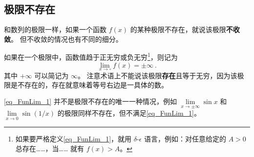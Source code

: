 \subsection{极限不存在}
和数列的极限一样，如果一个函数 $f(x)$ 的某种极限不存在，就说该极限\textbf{不收敛}。 但不收敛的情况也有不同的细分。

如果在一个极限中，函数值趋于正无穷或负无穷\footnote{如果要严格定义\autoref{eq_FunLim_1}，就用 $\delta$-$\epsilon$ 语言，例如：对任意给定的 $A > 0$ 总存在……，当…… 就有 $f(x) > A$。}，则记为
\begin{equation}\label{eq_FunLim_1}
\lim\limits_{x\to \square} f(x) = \pm\infty~.
\end{equation}
其中 $+\infty$ 可以简记为 $\infty$。 注意术语上不能说该极限\textbf{存在}且等于无穷，因为该极限是不存在的，存在就意味着等号右边是一具体的数。

\begin{example}{}
\autoref{eq_FunLim_1} 并不是极限不存在的唯一一种情况，例如 $\lim\limits_{x\to\pm\infty}\sin x$ 和 $\lim\limits_{x\to 0}\sin(1/x)$ 的极限同样不存在，但不满足\autoref{eq_FunLim_1}。
\end{example}
